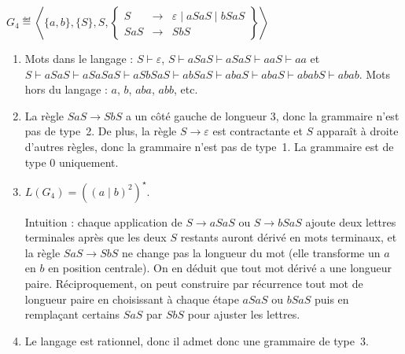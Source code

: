 \begin{exercice}
  \begin{questions}
  \item $G_4 \eqdef \left\langle \{a, b\}, \{S\}, S,
    \left\{\begin{array}{rcl}
    S   &\rightarrow& \varepsilon \mid  aSaS\mid  bSaS\\
    SaS &\rightarrow& SbS 
    \end{array}\right\}  \right\rangle$
  \end{questions}
  \begin{corrections}
    \begin{enumerate}
    \item Mots dans le langage :
      $S \vdash \varepsilon$,
      $S \vdash aSaS \vdash a S a S \vdash a a S \vdash aa$ et
      $S \vdash aSaS \vdash aSaS aS \vdash aSbS aS \vdash abS aS \vdash ab a S \vdash abaS \vdash ab a b S \vdash abab$.
      Mots hors du langage : $a$, $b$, $aba$, $abb$, etc.  
    \item La règle $SaS \to SbS$ a un côté gauche de longueur $3$,
      donc la grammaire n'est pas de type~2.  
      De plus, la règle $S \to \varepsilon$ est contractante et $S$ apparaît à
      droite d'autres règles, donc la grammaire n'est pas de type~1.  
      La grammaire est de type 0 uniquement.
    \item $L(G_4) = \left((a \mid b)^2\right)^\star$.
      
      Intuition : chaque application de $S \to aSaS$ ou $S \to bSaS$ ajoute deux lettres
      terminales après que les deux $S$ restants auront dérivé en mots terminaux,
      et la règle $SaS \to SbS$ ne change pas la longueur du mot (elle transforme un $a$ en $b$ en position centrale).  
      On en déduit que tout mot dérivé a une longueur paire.  
      Réciproquement, on peut construire par récurrence tout mot de longueur paire en choisissant à chaque
      étape $aSaS$ ou $bSaS$ puis en remplaçant certains $SaS$ par $SbS$ pour ajuster les lettres.
    \item Le langage est rationnel, donc il admet donc une grammaire de type~3.  
    \end{enumerate}
  \end{corrections}

\end{exercice}

\endgroup
\endinput
